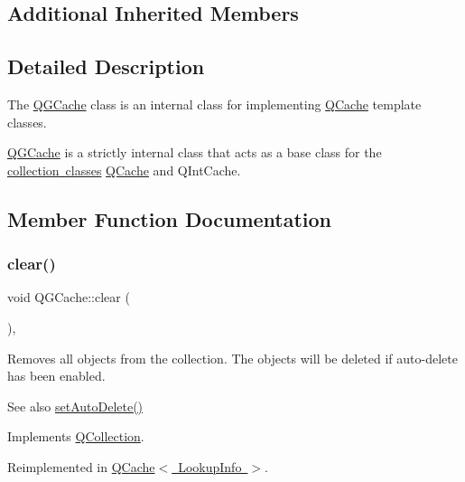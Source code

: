 \subsection*{Additional Inherited Members}


\subsection{Detailed Description}
The \mbox{\hyperlink{class_q_g_cache}{Q\+G\+Cache}} class is an internal class for implementing \mbox{\hyperlink{class_q_cache}{Q\+Cache}} template classes. 

\mbox{\hyperlink{class_q_g_cache}{Q\+G\+Cache}} is a strictly internal class that acts as a base class for the \mbox{\hyperlink{}{collection classes}} \mbox{\hyperlink{class_q_cache}{Q\+Cache}} and Q\+Int\+Cache. 

\subsection{Member Function Documentation}
\mbox{\label{class_q_g_cache_a3e0d8ce359e64a8793ef7f9d79dc546b}} 
\subsubsection{\texorpdfstring{clear()}{clear()}}
{\footnotesize\ttfamily void Q\+G\+Cache\+::clear (\begin{DoxyParamCaption}{ }\end{DoxyParamCaption})\hspace{0.3cm}{\ttfamily [protected]}, {\ttfamily [virtual]}}

Removes all objects from the collection. The objects will be deleted if auto-\/delete has been enabled. \begin{DoxySeeAlso}{See also}
\mbox{\hyperlink{class_q_collection_a6ed41913c76bfba54be6da26015ee3f3}{set\+Auto\+Delete()}} 
\end{DoxySeeAlso}


Implements \mbox{\hyperlink{class_q_collection_a92416cc22907550389aad04c26be2f77}{Q\+Collection}}.



Reimplemented in \mbox{\hyperlink{class_q_cache_a23066e089d1e7de0fc1f5ba85bd05719}{Q\+Cache$<$ Lookup\+Info $>$}}.

\mbox{\label{class_q_g_cache_a8da4537fdfd7eca8e1ae092775e5538d}} 
